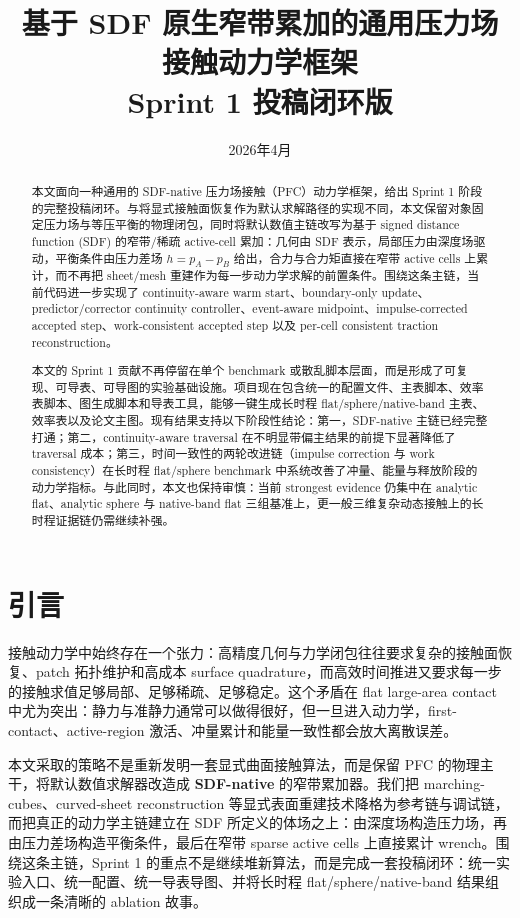 \documentclass[11pt,a4paper]{ctexart}
\title{基于 SDF 原生窄带累加的通用压力场接触动力学框架\\Sprint 1 投稿闭环版}
\author{}
\date{2026年4月}
\begin{document}
\maketitle

\begin{abstract}
本文面向一种通用的 SDF-native 压力场接触（PFC）动力学框架，给出 Sprint 1 阶段的完整投稿闭环。与将显式接触面恢复作为默认求解路径的实现不同，本文保留对象固定压力场与等压平衡的物理闭包，同时将默认数值主链改写为基于 signed distance function (SDF) 的窄带/稀疏 active-cell 累加：几何由 SDF 表示，局部压力由深度场驱动，平衡条件由压力差场 $h=p_A-p_B$ 给出，合力与合力矩直接在窄带 active cells 上累计，而不再把 sheet/mesh 重建作为每一步动力学求解的前置条件。围绕这条主链，当前代码进一步实现了 continuity-aware warm start、boundary-only update、predictor/corrector continuity controller、event-aware midpoint、impulse-corrected accepted step、work-consistent accepted step 以及 per-cell consistent traction reconstruction。

本文的 Sprint 1 贡献不再停留在单个 benchmark 或散乱脚本层面，而是形成了可复现、可导表、可导图的实验基础设施。项目现在包含统一的配置文件、主表脚本、效率表脚本、图生成脚本和导表工具，能够一键生成长时程 flat/sphere/native-band 主表、效率表以及论文主图。现有结果支持以下阶段性结论：第一，SDF-native 主链已经完整打通；第二，continuity-aware traversal 在不明显带偏主结果的前提下显著降低了 traversal 成本；第三，时间一致性的两轮改进链（impulse correction 与 work consistency）在长时程 flat/sphere benchmark 中系统改善了冲量、能量与释放阶段的动力学指标。与此同时，本文也保持审慎：当前 strongest evidence 仍集中在 analytic flat、analytic sphere 与 native-band flat 三组基准上，更一般三维复杂动态接触上的长时程证据链仍需继续补强。
\end{abstract}

\tableofcontents

\section{引言}
接触动力学中始终存在一个张力：高精度几何与力学闭包往往要求复杂的接触面恢复、patch 拓扑维护和高成本 surface quadrature，而高效时间推进又要求每一步的接触求值足够局部、足够稀疏、足够稳定。这个矛盾在 flat large-area contact 中尤为突出：静力与准静力通常可以做得很好，但一旦进入动力学，first-contact、active-region 激活、冲量累计和能量一致性都会放大离散误差。

本文采取的策略不是重新发明一套显式曲面接触算法，而是保留 PFC 的物理主干，将默认数值求解器改造成 \textbf{SDF-native} 的窄带累加器。我们把 marching-cubes、curved-sheet reconstruction 等显式表面重建技术降格为参考链与调试链，而把真正的动力学主链建立在 SDF 所定义的体场之上：由深度场构造压力场，再由压力差场构造平衡条件，最后在窄带 sparse active cells 上直接累计 wrench。围绕这条主链，Sprint 1 的重点不是继续堆新算法，而是完成一套投稿闭环：统一实验入口、统一配置、统一导表导图、并将长时程 flat/sphere/native-band 结果组织成一条清晰的 ablation 故事。
\end{document}
